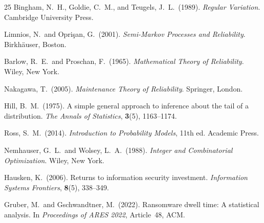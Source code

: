 \documentclass[12pt,a4paper]{article}
\theoremstyle{plain}
\theoremstyle{definition}
\theoremstyle{remark}
\begin{document}
\begin{thebibliography}{25}
Bingham, N.\ H., Goldie, C.\ M., and Teugels, J.\ L.\ (1989).
\textit{Regular Variation}.
Cambridge University Press.

Limnios, N.\ and Opri\c{s}an, G.\ (2001).
\textit{Semi-Markov Processes and Reliability}.
Birkh\"{a}user, Boston.

Barlow, R.\ E.\ and Proschan, F.\ (1965).
\textit{Mathematical Theory of Reliability}.
Wiley, New York.

Nakagawa, T.\ (2005).
\textit{Maintenance Theory of Reliability}.
Springer, London.

Hill, B.\ M.\ (1975).
A simple general approach to inference about the tail of a distribution.
\textit{The Annals of Statistics}, \textbf{3}(5), 1163--1174.

Ross, S.\ M.\ (2014).
\textit{Introduction to Probability Models}, 11th ed.
Academic Press.

Nemhauser, G.\ L.\ and Wolsey, L.\ A.\ (1988).
\textit{Integer and Combinatorial Optimization}.
Wiley, New York.

Hausken, K.\ (2006).
Returns to information security investment.
\textit{Information Systems Frontiers},
\textbf{8}(5), 338--349.

Gruber, M.\ and Gschwandtner, M.\ (2022).
Ransomware dwell time: A statistical analysis.
In \textit{Proceedings of ARES 2022}, Article~48, ACM.

\end{thebibliography}
\end{document}
